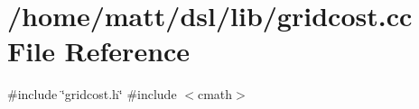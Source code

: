 \section{/home/matt/dsl/lib/gridcost.cc \-File \-Reference}
\label{gridcost_8cc}
{\ttfamily \#include \char`\"{}gridcost.\-h\char`\"{}}\*
{\ttfamily \#include $<$cmath$>$}\*
